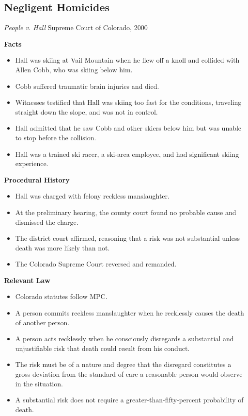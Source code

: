 \documentclass[11pt]{tex/lawoutline}
\begin{document}
\subsection{Negligent Homicides}
\casebox
    {\textit{People v. Hall}}
    {Supreme Court of Colorado, 2000}
    {
        \textbf{Facts}
        \begin{itemize}
            \item Hall was skiing at Vail Mountain when he flew off a knoll and collided with Allen Cobb, who was skiing below him.
            \item Cobb suffered traumatic brain injuries and died.
            \item Witnesses testified that Hall was skiing too fast for the conditions, traveling straight down the slope, and was not in control.
            \item Hall admitted that he saw Cobb and other skiers below him but was unable to stop before the collision.
            \item Hall was a trained ski racer, a ski-area employee, and had significant skiing experience.
        \end{itemize}

        \textbf{Procedural History}
        \begin{itemize}
            \item Hall was charged with felony reckless manslaughter.
            \item At the preliminary hearing, the county court found no probable cause and dismissed the charge.
            \item The district court affirmed, reasoning that a risk was not substantial unless death was more likely than not.
            \item The Colorado Supreme Court reversed and remanded.
        \end{itemize}

        \textbf{Relevant Law}
        \begin{itemize}
            \item Colorado statutes follow MPC.
            \item A person commits reckless manslaughter when he recklessly causes the death of another person.
            \item A person acts recklessly when he consciously disregards a substantial and unjustifiable risk that death could result from his conduct.
            \item The risk must be of a nature and degree that the disregard constitutes a gross deviation from the standard of care a reasonable person would observe in the situation.
            \item A substantial risk does not require a greater-than-fifty-percent probability of death.
        \end{itemize}

}
\end{document}
